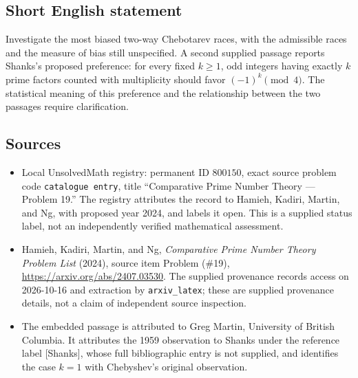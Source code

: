 \documentclass[11pt]{article}
\begin{document}
\subsection{Short English statement}
Investigate the most biased two-way Chebotarev races, with the admissible races and the measure of bias still unspecified. A second supplied passage reports Shanks's proposed preference: for every fixed \(k\ge1\), odd integers having exactly \(k\) prime factors counted with multiplicity should favor \((-1)^k\pmod4\). The statistical meaning of this preference and the relationship between the two passages require clarification.
\subsection{Sources}
\begin{itemize}
\item Local UnsolvedMath registry: permanent ID \(800150\), exact source problem code \texttt{catalogue entry}, title ``Comparative Prime Number Theory --- Problem 19.'' The registry attributes the record to Hamieh, Kadiri, Martin, and Ng, with proposed year 2024, and labels it open. This is a supplied status label, not an independently verified mathematical assessment.
\item Hamieh, Kadiri, Martin, and Ng, \emph{Comparative Prime Number Theory Problem List} (2024), source item Problem (\#19), \url{https://arxiv.org/abs/2407.03530}. The supplied provenance records access on 2026-10-16 and extraction by \texttt{arxiv\_latex}; these are supplied provenance details, not a claim of independent source inspection.
\item The embedded passage is attributed to Greg Martin, University of British Columbia. It attributes the 1959 observation to Shanks under the reference label [Shanks], whose full bibliographic entry is not supplied, and identifies the case \(k=1\) with Chebyshev's original observation.
\end{itemize}
\end{document}
